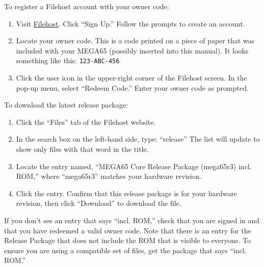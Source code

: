 To register a Filehost account with your owner code:

\begin{enumerate}
  \item Visit \href{https://files.mega65.org}{Filehost}. Click ``Sign Up.'' Follow the prompts to create an account.
  \item Locate your owner code. This is a code printed on a piece of paper that was included with your MEGA65 (possibly inserted into this manual). It looks something like this: {\tt 123-ABC-456}
  \item Click the user icon in the upper-right corner of the Filehost screen. In the pop-up menu, select ``Redeem Code.'' Enter your owner code as prompted.
\end{enumerate}

\begin{center}
\end{center}

To download the latest release package:

\begin{enumerate}
  \item Click the ``Files'' tab of the Filehost website.
  \item In the search box on the left-hand side, type: ``release'' The list will update to show only files with that word in the title.
  \item Locate the entry named, ``MEGA65 Core Release Package (mega65r3) incl. ROM,'' where ``mega65r3'' matches your hardware revision.
  \item Click the entry. Confirm that this release package is for your hardware revision, then click ``Download'' to download the file.
\end{enumerate}

If you don't see an entry that says ``incl. ROM,'' check that you are signed in and that you have redeemed a valid owner code. Note that there is an entry for the Release Package that does not include the ROM that is visible to everyone. To ensure you are using a compatible set of files, get the package that says ``incl. ROM.''

